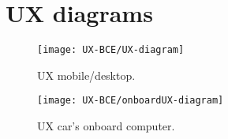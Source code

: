 \section{UX diagrams}

\begin{figure}[H]
	\centering
	\texttt{[image: UX-BCE/UX-diagram]}
	\caption[Mobile App/Desktop UX Diagram]{UX mobile/desktop.}
	\label{fig:mobile/desktop UX-diagram}
\end{figure}

\begin{figure}[H]
	\centering
	\texttt{[image: UX-BCE/onboardUX-diagram]}
	\caption[Onboard Computer UX Diagram]{UX car's onboard computer.}
	\label{fig:onboard-computer-UX-diagram}
\end{figure}
